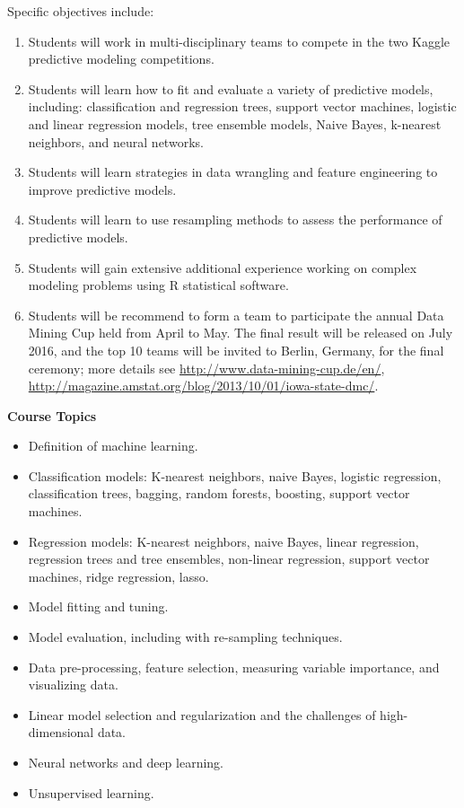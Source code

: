 \documentclass[11pt,oneside]{amsart}
\newcommand{\header}[1]{\bigbreak\textbf{#1}}
\begin{document}
Specific objectives include: 

\begin{enumerate}
\item Students will work in multi-disciplinary teams to compete in the two Kaggle predictive modeling competitions.
\item Students will learn how to fit and evaluate a variety of
  predictive models, including: classification and regression trees,
  support vector machines, logistic and linear regression models,
  tree ensemble models, Naive Bayes, k-nearest neighbors, and neural networks.
\item Students will learn strategies in data wrangling and feature engineering to improve
  predictive models.
\item Students will learn to use resampling methods to assess the
  performance of predictive models.
\item Students will gain extensive additional experience working on
  complex modeling problems using R statistical software. 
  \item Students will be recommend to form a team to participate the annual Data Mining Cup held from April to May. The final result will be released on July 2016, and the top 10 teams will be invited to Berlin, Germany, for the final ceremony; more details see \url{http://www.data-mining-cup.de/en/}, \url{http://magazine.amstat.org/blog/2013/10/01/iowa-state-dmc/}.
\end{enumerate}


\header{Course Topics}

\begin{itemize}
\item Definition of machine learning.
\item Classification models: K-nearest neighbors, naive Bayes,
  logistic regression, classification trees, bagging, random forests,
  boosting, support vector machines.
\item Regression models: K-nearest neighbors, naive Bayes, linear
  regression, regression trees and tree ensembles, non-linear
  regression, support vector machines, ridge regression, lasso.
\item Model fitting and tuning.
\item Model evaluation, including with re-sampling techniques.
\item Data pre-processing, feature selection, measuring variable
  importance, and visualizing data.
\item Linear model selection and regularization and the challenges of
  high-dimensional data.
\item Neural networks and deep learning.
\item Unsupervised learning.
\end{itemize}
\end{document}
